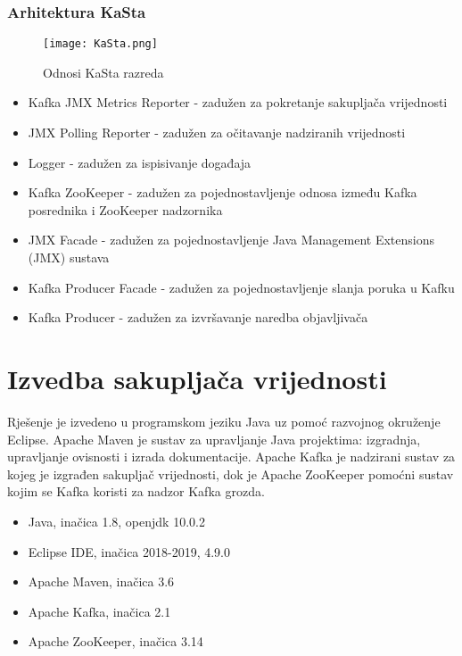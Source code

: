 \documentclass[utf8, diplomski, lmodern, numeric]{fer}
\begin{document}
\subsection{Arhitektura KaSta}

\begin{figure}[H]
    \centering
    \texttt{[image: KaSta.png]}
    \caption{Odnosi KaSta razreda}
    \label{fig:kafka-metrics-reporter}
\end{figure}

\begin{itemize}
    \item Kafka JMX Metrics Reporter - zadužen za pokretanje sakupljača vrijednosti
    \item JMX Polling Reporter - zadužen za očitavanje nadziranih vrijednosti
    \item Logger - zadužen za ispisivanje događaja
    \item Kafka ZooKeeper - zadužen za pojednostavljenje odnosa između Kafka posrednika i ZooKeeper nadzornika
    \item JMX Facade - zadužen za pojednostavljenje Java Management Extensions (JMX) sustava
    \item Kafka Producer Facade - zadužen za pojednostavljenje slanja poruka u Kafku
    \item Kafka Producer - zadužen za izvršavanje naredba objavljivača
\end{itemize}



\chapter{Izvedba sakupljača vrijednosti}

Rješenje je izvedeno u programskom jeziku Java uz pomoć razvojnog okruženje Eclipse. Apache Maven je sustav za upravljanje Java projektima: izgradnja, upravljanje ovisnosti i izrada dokumentacije. Apache Kafka je nadzirani sustav za kojeg je izgrađen sakupljač vrijednosti, dok je Apache ZooKeeper pomoćni sustav kojim se Kafka koristi za nadzor Kafka grozda.

\begin{itemize}
    \item Java, inačica 1.8, openjdk 10.0.2
    \item Eclipse IDE, inačica 2018-2019, 4.9.0
    \item Apache Maven, inačica 3.6
    \item Apache Kafka, inačica 2.1
    \item Apache ZooKeeper, inačica 3.14
\end{itemize}
\end{document}
